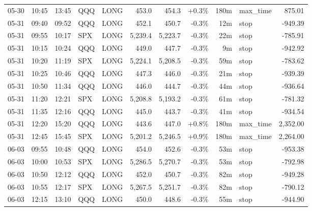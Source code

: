 \documentclass[11pt,a4paper,twoside]{article}
\begin{document}
\begin{center}
\begin{longtable}{>{\color{txtmain}}l l l l l r r r r >{\color{txtmain}}l r}
05-30 & 10:45 & 13:45 & QQQ & LONG & 453.0 & 454.3 & \textcolor{wingreen}{+0.3\%} & 180m & max\_time & \textcolor{wingreen}{875.01} \\
05-31 & 09:40 & 09:52 & QQQ & LONG & 452.1 & 450.7 & \textcolor{lossred}{-0.3\%} & 12m & stop & \textcolor{lossred}{-949.39} \\
05-31 & 09:55 & 10:17 & SPX & LONG & 5,239.4 & 5,223.7 & \textcolor{lossred}{-0.3\%} & 22m & stop & \textcolor{lossred}{-785.91} \\
05-31 & 10:15 & 10:24 & QQQ & LONG & 449.0 & 447.7 & \textcolor{lossred}{-0.3\%} & 9m & stop & \textcolor{lossred}{-942.92} \\
05-31 & 10:20 & 11:19 & SPX & LONG & 5,224.1 & 5,208.5 & \textcolor{lossred}{-0.3\%} & 59m & stop & \textcolor{lossred}{-783.62} \\
05-31 & 10:25 & 10:46 & QQQ & LONG & 447.3 & 446.0 & \textcolor{lossred}{-0.3\%} & 21m & stop & \textcolor{lossred}{-939.39} \\
05-31 & 10:50 & 11:34 & QQQ & LONG & 446.0 & 444.7 & \textcolor{lossred}{-0.3\%} & 44m & stop & \textcolor{lossred}{-936.64} \\
05-31 & 11:20 & 12:21 & SPX & LONG & 5,208.8 & 5,193.2 & \textcolor{lossred}{-0.3\%} & 61m & stop & \textcolor{lossred}{-781.32} \\
05-31 & 11:35 & 12:16 & QQQ & LONG & 445.0 & 443.7 & \textcolor{lossred}{-0.3\%} & 41m & stop & \textcolor{lossred}{-934.54} \\
05-31 & 12:20 & 15:20 & QQQ & LONG & 443.6 & 447.0 & \textcolor{wingreen}{+0.8\%} & 180m & max\_time & \textcolor{wingreen}{2,352.00} \\
05-31 & 12:45 & 15:45 & SPX & LONG & 5,201.2 & 5,246.5 & \textcolor{wingreen}{+0.9\%} & 180m & max\_time & \textcolor{wingreen}{2,264.00} \\
06-03 & 09:55 & 10:48 & QQQ & LONG & 454.0 & 452.6 & \textcolor{lossred}{-0.3\%} & 53m & stop & \textcolor{lossred}{-953.38} \\
06-03 & 10:00 & 10:53 & SPX & LONG & 5,286.5 & 5,270.7 & \textcolor{lossred}{-0.3\%} & 53m & stop & \textcolor{lossred}{-792.98} \\
06-03 & 10:50 & 12:12 & QQQ & LONG & 452.0 & 450.7 & \textcolor{lossred}{-0.3\%} & 82m & stop & \textcolor{lossred}{-949.28} \\
06-03 & 10:55 & 12:17 & SPX & LONG & 5,267.5 & 5,251.7 & \textcolor{lossred}{-0.3\%} & 82m & stop & \textcolor{lossred}{-790.12} \\
06-03 & 12:15 & 13:10 & QQQ & LONG & 450.0 & 448.6 & \textcolor{lossred}{-0.3\%} & 55m & stop & \textcolor{lossred}{-944.90} \\

\end{longtable}
\end{center}
\end{document}
